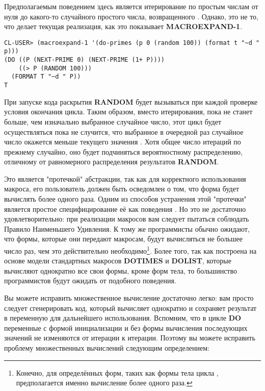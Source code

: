 Предполагаемым поведением здесь является итерирование по простым числам от нуля до
какого-то случайного простого числа, возвращенного . Однако, это не то,
что делает текущая реализация, как это показывает \textbf{MACROEXPAND-1}.

\begin{lstlisting}
CL-USER> (macroexpand-1 '(do-primes (p 0 (random 100)) (format t "~d " p)))
(DO ((P (NEXT-PRIME 0) (NEXT-PRIME (1+ P))))
    ((> P (RANDOM 100)))
  (FORMAT T "~d " P))
T
\end{lstlisting}

При запуске кода раскрытия \textbf{RANDOM} будет вызываться при каждой проверке условия
окончания цикла. Таким образом, вместо итерирования, пока  не станет больше, чем
изначально выбранное случайное число, этот цикл будет осуществляться пока не случится, что
выбранное в очередной раз случайное число окажется меньше текущего значения . Хотя
общее число итераций по прежнему случайно, оно будет подчиняться вероятностному
распределению, отличному от равномерного распределения результатов \textbf{RANDOM}.

Это является "протечкой" абстракции, так как для корректного использования макроса, его
пользователь должен быть осведомлен о том, что форма  будет вычислять более
одного раза. Одним из способов устранения этой "протечки" является простое
специфицирование её как поведения . Но это не достаточно
удовлетворительно: при реализации макросов вам следует пытаться соблюдать Правило
Наименьшего Удивления. К тому же программисты обычно ожидают, что формы, которые они
передают макросам, будут вычисляться не большее число раз, чем это действительно
необходимо\footnote{Конечно, для определённых форм, таких как формы тела цикла
  , предполагается именно вычисление более одного раза.}. Более того, так
как  построена на основе модели стандартных макросов \textbf{DOTIMES} и
\textbf{DOLIST}, которые вычисляют однократно все свои формы, кроме форм тела, то
большинство программистов будут ожидать от  подобного поведения.

Вы можете исправить множественное вычисление достаточно легко: вам просто следует
сгенерировать код, который вычисляет  однократно и сохраняет результат в
переменную для дальнейшего использования. Вспомним, что в цикле \textbf{DO} переменные с
формой инициализации и без формы вычисления последующих значений не изменяются от итерации
к итерации. Поэтому вы можете исправить проблему множественных вычислений следующим
определением:

